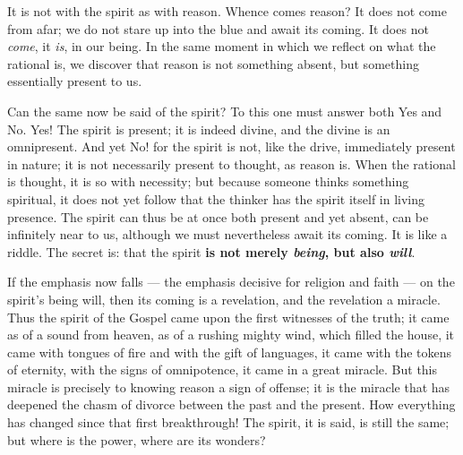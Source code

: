 \documentclass[12pt,a4paper,openany]{book}
\newcommand{\opage}[1]{\marginnote{\footnotesize\textit{[#1]}}}
\begin{document}
It is not with the spirit as with reason.
Whence comes reason? It does not come from afar;
we do not stare up into the blue and await its coming.
It does not \emph{come}, it \emph{is}, in our being. In the same
moment in which we reflect on what the rational is,
we discover that reason is not something absent, but something
essentially present to us.

Can the same now be said of the spirit? To this one must
answer both Yes and No. Yes! The spirit is present;
it is indeed divine, and the divine is an omnipresent.
And yet No! for the spirit is not, like the
drive, immediately present in nature; it is not
necessarily present to thought, as reason is. When
the rational is thought, it is so with necessity; but
because someone thinks something spiritual, it does not yet follow
\setcounter{footnote}{0}%
\opage{49}that the thinker has the spirit itself in living presence.
The spirit can thus be at once both
present and yet absent, can be infinitely near
to us, although we must nevertheless await its coming. It
is like a riddle. The secret is: that the spirit
\textbf{is not merely \emph{being}, but also \emph{will}}.

If the emphasis now falls --- the emphasis decisive for religion and faith --- on
the spirit's being will, then its
coming is a revelation, and the revelation a miracle.
Thus the spirit of the Gospel came upon the first
witnesses of the truth; it came as of a sound from heaven, as of a rushing
mighty wind, which filled the house, it came with
tongues of fire and with the gift of languages, it came
with the tokens of eternity, with the signs of omnipotence, it came in a
great miracle. But this miracle is precisely to knowing
reason a sign of offense; it is the miracle that has deepened
the chasm of divorce between the past and the present. How
everything has changed since that first breakthrough!
The spirit, it is said, is still the same; but where is
the power, where are its wonders?
\end{document}
